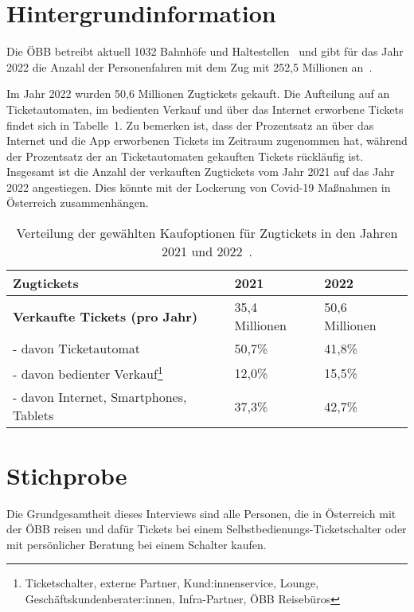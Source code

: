 \documentclass[]{article}
\begin{document}
\section{Hintergrundinformation}
Die ÖBB betreibt aktuell 1032 Bahnhöfe und Haltestellen~\cite{oebbinfra_zahlendatenfakten2022} und gibt für das Jahr 2022 die Anzahl der Personenfahren mit dem Zug mit 252,5 Millionen an~\cite{oebb_zahlendatenfakten202223}.

Im Jahr 2022 wurden 50,6 Millionen Zugtickets gekauft. Die Aufteilung auf an Ticketautomaten, im bedienten Verkauf und über das Internet erworbene Tickets findet sich in Tabelle~1. Zu bemerken ist, dass der Prozentsatz an über das Internet und die App erworbenen Tickets im Zeitraum zugenommen hat, während der Prozentsatz der an Ticketautomaten gekauften Tickets rückläufig ist. Insgesamt ist die Anzahl der verkauften Zugtickets vom Jahr 2021 auf das Jahr 2022 angestiegen. Dies könnte mit der Lockerung von Covid-19 Maßnahmen in Österreich zusammenhängen.

\begin{table}
\begin{minipage}{\textwidth}
	\label{tab:zugtickets_aufteilung}
	\centering
	\begin{tabular}{|l|l|l|}
		\hline
		\textbf{Zugtickets} & \textbf{2021} & \textbf{2022} \\
		\hline
		\textbf{Verkaufte Tickets (pro Jahr)} & 35,4 Millionen & 50,6 Millionen \\
		\hline
		- davon Ticketautomat & 50,7\% & 41,8\% \\
		\hline
		- davon bedienter Verkauf\footnote{Ticketschalter, externe Partner, Kund:innenservice, Lounge, Geschäftskundenberater:innen, Infra-Partner, ÖBB Reisebüros} & 12,0\% & 15,5\% \\
		\hline
		- davon Internet, Smartphones, Tablets & 37,3\% & 42,7\% \\
		\hline
	\end{tabular}
\end{minipage}
	\caption{Verteilung der gewählten Kaufoptionen für Zugtickets in den Jahren 2021 und 2022~\cite{oebb_zahlendatenfakten202223}.}
\end{table}




\section{Stichprobe}
Die Grundgesamtheit dieses Interviews sind alle Personen, die in Österreich mit der ÖBB reisen und dafür Tickets bei einem Selbstbedienungs-Ticketschalter oder mit persönlicher Beratung bei einem Schalter kaufen.
\end{document}
